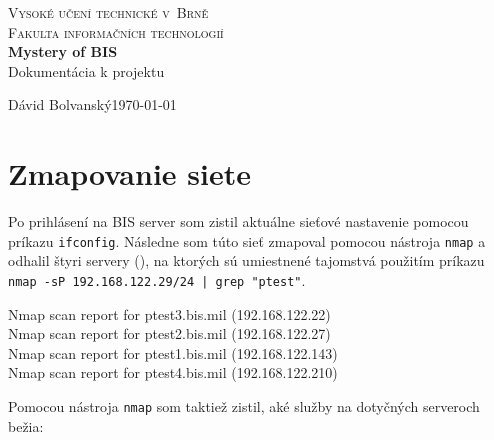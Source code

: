 \documentclass[]{article}
\begin{document}
\begin{titlepage}
	\begin{center}
		\textsc{{\LARGE Vysoké učení technické v~Brně\\[0.3em]
				Fakulta informačních technologií}}\\
		{\Huge \textbf{Mystery of BIS}\\[0.5em]Dokumentácia k projektu}
	\end{center}

	{\noindent \large Dávid Bolvanský\hfill \today}
\end{titlepage}

\section*{Zmapovanie siete}
Po prihlásení na BIS server som zistil aktuálne sieťové nastavenie pomocou príkazu \texttt{ifconfig}. Následne som túto sieť zmapoval pomocou nástroja \texttt{nmap} a odhalil štyri servery (), na ktorých sú umiestnené tajomstvá použitím príkazu \texttt{nmap -sP 192.168.122.29/24 | grep "ptest"}.

\begin{framed}
\noindent Nmap scan report for ptest3.bis.mil (192.168.122.22)\\
Nmap scan report for ptest2.bis.mil (192.168.122.27)\\
Nmap scan report for ptest1.bis.mil (192.168.122.143)\\
Nmap scan report for ptest4.bis.mil (192.168.122.210)
\end{framed}

\noindent Pomocou nástroja \texttt{nmap} som taktiež zistil, aké služby na dotyčných serveroch bežia:
\end{document}
